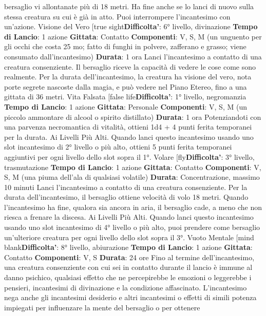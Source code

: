 \begin{multicols}{2}
bersaglio vi allontanate più di 18 metri. Ha fine anche
se lo lanci di nuovo sulla stessa creatura su cui è già in
atto. Puoi interrompere l’incantesimo con un’azione.
Visione del Vero
[true sight\textbf{Difficolta'}:
6° livello, divinazione
\textbf{Tempo di Lancio}: 1 azione
\textbf{Gittata}: Contatto
\textbf{Componenti}: V, S, M (un unguento per gli occhi che
costa 25 mo; fatto di funghi in polvere, zafferano e
grasso; viene consumato dall’incantesimo)
\textbf{Durata}: 1 ora
Lanci l’incantesimo a contatto di una creatura
consenziente. Il bersaglio riceve la capacità di vedere le
cose come sono realmente. Per la durata
dell’incantesimo, la creatura ha visione del vero, nota
porte segrete nascoste dalla magia, e può vedere nel
Piano Etereo, fino a una gittata di 36 metri.
Vita Falsata
[false life\textbf{Difficolta'}:
1° livello, negromanzia
\textbf{Tempo di Lancio}: 1 azione
\textbf{Gittata}: Personale
\textbf{Componenti}: V, S, M (un piccolo ammontare di alcool
o spirito distillato)
\textbf{Durata}: 1 ora
Potenziandoti con una parvenza necromantica di
vitalità, ottieni 1d4 + 4 punti ferita temporanei per la
durata.
Ai Livelli Più Alti. Quando lanci questo incantesimo
usando uno slot incantesimo di 2° livello o più alto,
ottieni 5 punti ferita temporanei aggiuntivi per ogni
livello dello slot sopra il 1°.
Volare
[fly\textbf{Difficolta'}:
3° livello, trasmutazione
\textbf{Tempo di Lancio}: 1 azione
\textbf{Gittata}: Contatto
\textbf{Componenti}: V, S, M (una piuma dell’ala di qualsiasi
volatile)
\textbf{Durata}: Concentrazione, massimo 10 minuti
Lanci l’incantesimo a contatto di una creatura
consenziente. Per la durata dell’incantesimo, il
bersaglio ottiene velocità di volo 18 metri. Quando
l’incantesimo ha fine, qualora sia ancora in aria, il
bersaglio cade, a meno che non riesca a frenare la
discesa.
Ai Livelli Più Alti. Quando lanci questo incantesimo
usando uno slot incantesimo di 4° livello o più alto, puoi
prendere come bersaglio un’ulteriore creatura per ogni
livello dello slot sopra il 3°.
Vuoto Mentale
[mind blank\textbf{Difficolta'}:
8° livello, abiurazione
\textbf{Tempo di Lancio}: 1 azione
\textbf{Gittata}: Contatto
\textbf{Componenti}: V, S
\textbf{Durata}: 24 ore
Fino al termine dell’incantesimo, una creatura
consenziente con cui sei in contatto durante il lancio è
immune al danno psichico, qualsiasi effetto che ne
percepirebbe le emozioni o leggerebbe i pensieri,
incantesimi di divinazione e la condizione affascinato.
L’incantesimo nega anche gli incantesimi desiderio e
altri incantesimi o effetti di simili potenza impiegati per
influenzare la mente del bersaglio o per ottenere

\end{multicols}
